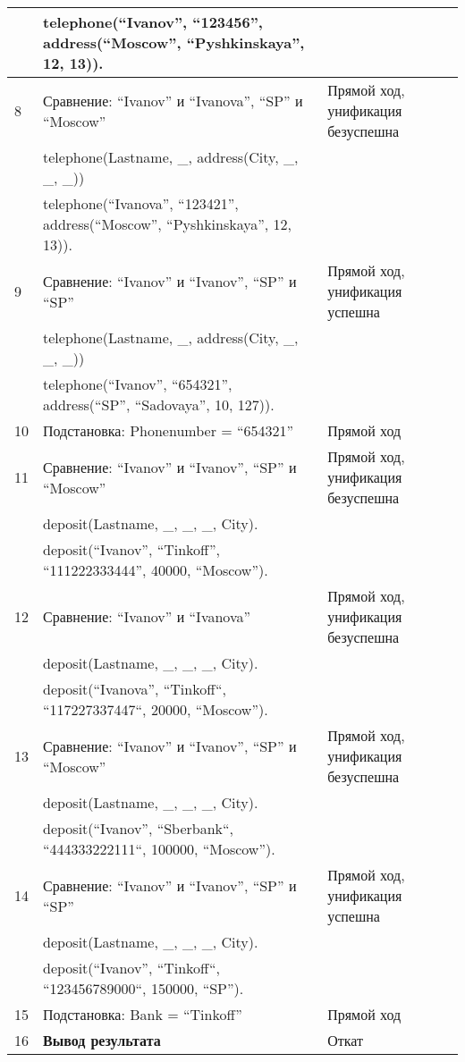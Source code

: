 {\begin{longtable}{|p{1.15cm}|p{8cm}|p{8cm}|}
      & telephone(``Ivanov'', ``123456'', address(``Moscow'', ``Pyshkinskaya'', 12, 13)). & \\
    \hline
    8 & Сравнение: ``Ivanov'' и ``Ivanova'', ``SP'' и ``Moscow'' & Прямой ход, унификация безуспешна \\
      & telephone(Lastname, \_, address(City, \_, \_, \_)) & \\
      & telephone(``Ivanova'', ``123421'', address(``Moscow'', ``Pyshkinskaya'', 12, 13)). & \\
    \hline
    9 & Сравнение: ``Ivanov'' и ``Ivanov'', ``SP'' и ``SP'' & Прямой ход, унификация успешна \\
      & telephone(Lastname, \_, address(City, \_, \_, \_)) & \\
      & telephone(``Ivanov'', ``654321'', address(``SP'', ``Sadovaya'', 10, 127)). & \\
    \hline
    10 & Подстановка: Phonenumber = ``654321'' & Прямой ход \\
    \hline
    11 & Сравнение: ``Ivanov'' и ``Ivanov'', ``SP'' и ``Moscow'' & Прямой ход, унификация безуспешна \\
       & deposit(Lastname, \_, \_, \_, City). & \\
       & deposit(``Ivanov'', ``Tinkoff'', ``111222333444'', 40000, ``Moscow''). & \\
    \hline
    12 & Сравнение: ``Ivanov'' и ``Ivanova'' & Прямой ход, унификация безуспешна \\
       & deposit(Lastname, \_, \_, \_, City). & \\
       & deposit(``Ivanova'', ``Tinkoff``, ``117227337447``, 20000, ``Moscow''). & \\
    \hline
    13 & Сравнение: ``Ivanov'' и ``Ivanov'', ``SP'' и ``Moscow'' & Прямой ход, унификация безуспешна \\
       & deposit(Lastname, \_, \_, \_, City). & \\
       & deposit(``Ivanov'', ``Sberbank``, ``444333222111``, 100000, ``Moscow''). & \\
    \hline
    14 & Сравнение: ``Ivanov'' и ``Ivanov'', ``SP'' и ``SP'' & Прямой ход, унификация успешна \\
       & deposit(Lastname, \_, \_, \_, City). & \\
       & deposit(``Ivanov'', ``Tinkoff``, ``123456789000``, 150000, ``SP''). & \\
    \hline
    15 & Подстановка: Bank = ``Tinkoff'' & Прямой ход \\
    \hline
    16 & \textbf{Вывод результата} & Откат \\

\end{longtable}}
